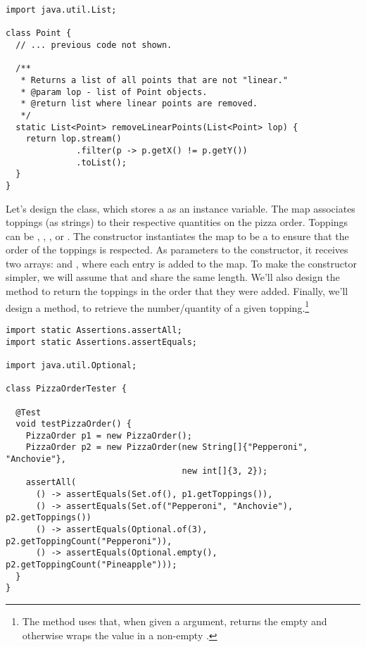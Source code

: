 \enlargethispage{-1\baselineskip}
\begin{lstlisting}[language=MyJava]
import java.util.List;

class Point {
  // ... previous code not shown. 

  /**
   * Returns a list of all points that are not "linear."
   * @param lop - list of Point objects.
   * @return list where linear points are removed.
   */
  static List<Point> removeLinearPoints(List<Point> lop) {
    return lop.stream()
              .filter(p -> p.getX() != p.getY())
              .toList();
  }
}
\end{lstlisting}

Let's design the  class, which stores a  as an instance variable.
The map associates toppings (as strings) to their respective quantities on the pizza order. 
Toppings can be , , , or .
The  constructor instantiates the map to be a  to ensure that the order of the toppings is respected.
As parameters to the constructor, it receives two arrays:  and , where each entry is added to the map.
To make the constructor simpler, we will assume that  and  share the same length.
We'll also design the  method to return the toppings in the order that they were added.
Finally, we'll design a method,  to retrieve the number/quantity of a given topping.\footnote{The  method uses  that, when given a  argument, returns the empty  and otherwise wraps the value in a non-empty .}

\begin{lstlisting}[language=MyJava]
import static Assertions.assertAll;
import static Assertions.assertEquals;

import java.util.Optional;

class PizzaOrderTester {

  @Test
  void testPizzaOrder() {
    PizzaOrder p1 = new PizzaOrder();
    PizzaOrder p2 = new PizzaOrder(new String[]{"Pepperoni", "Anchovie"},
                                   new int[]{3, 2});
    assertAll(
      () -> assertEquals(Set.of(), p1.getToppings()),
      () -> assertEquals(Set.of("Pepperoni", "Anchovie"), p2.getToppings())
      () -> assertEquals(Optional.of(3), p2.getToppingCount("Pepperoni")),
      () -> assertEquals(Optional.empty(), p2.getToppingCount("Pineapple")));
  }
}
\end{lstlisting}

